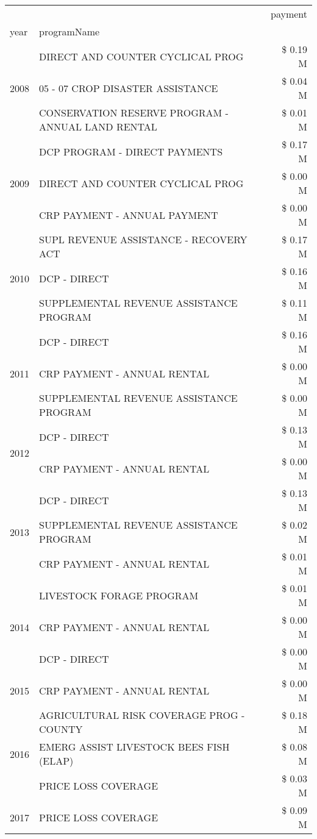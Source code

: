 \begin{tabular}{llr}
\toprule
 &  & payment \\
year & programName &  \\
\midrule
\multirow[t]{3}{*}{2008} & DIRECT AND COUNTER CYCLICAL PROG & \$ 0.19 M \\
 & 05 - 07 CROP DISASTER ASSISTANCE & \$ 0.04 M \\
 & CONSERVATION RESERVE PROGRAM - ANNUAL LAND RENTAL & \$ 0.01 M \\
\cline{1-3}
\multirow[t]{3}{*}{2009} & DCP PROGRAM - DIRECT PAYMENTS & \$ 0.17 M \\
 & DIRECT AND COUNTER CYCLICAL PROG & \$ 0.00 M \\
 & CRP PAYMENT - ANNUAL PAYMENT & \$ 0.00 M \\
\cline{1-3}
\multirow[t]{3}{*}{2010} & SUPL REVENUE ASSISTANCE - RECOVERY ACT & \$ 0.17 M \\
 & DCP - DIRECT & \$ 0.16 M \\
 & SUPPLEMENTAL REVENUE ASSISTANCE PROGRAM & \$ 0.11 M \\
\cline{1-3}
\multirow[t]{3}{*}{2011} & DCP - DIRECT & \$ 0.16 M \\
 & CRP PAYMENT - ANNUAL RENTAL & \$ 0.00 M \\
 & SUPPLEMENTAL REVENUE ASSISTANCE PROGRAM & \$ 0.00 M \\
\cline{1-3}
\multirow[t]{2}{*}{2012} & DCP - DIRECT & \$ 0.13 M \\
 & CRP PAYMENT - ANNUAL RENTAL & \$ 0.00 M \\
\cline{1-3}
\multirow[t]{3}{*}{2013} & DCP - DIRECT & \$ 0.13 M \\
 & SUPPLEMENTAL REVENUE ASSISTANCE PROGRAM & \$ 0.02 M \\
 & CRP PAYMENT - ANNUAL RENTAL & \$ 0.01 M \\
\cline{1-3}
\multirow[t]{3}{*}{2014} & LIVESTOCK FORAGE PROGRAM & \$ 0.01 M \\
 & CRP PAYMENT - ANNUAL RENTAL & \$ 0.00 M \\
 & DCP - DIRECT & \$ 0.00 M \\
\cline{1-3}
2015 & CRP PAYMENT - ANNUAL RENTAL & \$ 0.00 M \\
\cline{1-3}
\multirow[t]{3}{*}{2016} & AGRICULTURAL RISK COVERAGE PROG - COUNTY & \$ 0.18 M \\
 & EMERG ASSIST LIVESTOCK BEES FISH (ELAP) & \$ 0.08 M \\
 & PRICE LOSS COVERAGE & \$ 0.03 M \\
\cline{1-3}
\multirow[t]{3}{*}{2017} & PRICE LOSS COVERAGE & \$ 0.09 M \\

\end{tabular}

